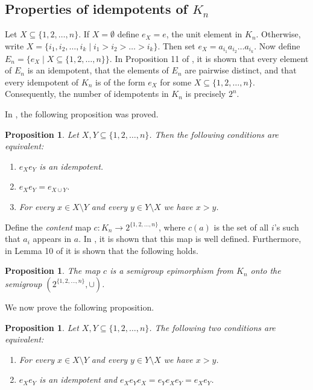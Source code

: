 \documentclass[pdflatex,sn-mathphys-num]{sn-jnl}%
\theoremstyle{thmstyleone}%
\newtheorem{proposition}[theorem]{Proposition}%
\theoremstyle{thmstyletwo}%
\theoremstyle{thmstylethree}%
\begin{document}
\subsection{Properties of idempotents of $K_n$}

Let $X \subseteq \{1, 2, \dots , n\}$. If $X = \emptyset$ define $e_X = e$, the unit element in $K_n$. Otherwise, write $X = \{i_1, i_2, \dots , i_k \mid i_1 > i_2 > \dots > i_k\}$. Then set
$e_X = a_{i_1} a_{i_2} \dots a_{i_k}$. Now define $E_n = \{e_X \mid X \subseteq \{1, 2, \dots, n\}\}$. In Proposition 11 of \cite{GK}, it is shown that every element of $E_n$ is an idempotent, that the elements of $E_n$ are pairwise distinct, and that every idempotent of $K_n$ is of the form $e_X$ for some $X \subseteq \{1, 2, \dots , n\}$. Consequently, the number of idempotents in $K_n$ is precisely $2^n$. 


In \cite[Proposition 14]{GK}, the following proposition was proved. 

\begin{proposition}\label{idem:eq}
   Let $X, Y \subseteq \{1, 2, \dots, n\}$. Then the following conditions are equivalent:
   \begin{enumerate}
      \item $e_X e_Y$ is an idempotent.
      \item $e_X e_Y = e_{X \cup Y}$.
      \item For every $x \in X \setminus Y$ and every $y \in Y \setminus X$ we have $x > y$.
   \end{enumerate}
\end{proposition}


Define the \emph{content} map $c : K_n \rightarrow 2^{\{1, 2, \dots, n\}}$, where $c(a)$ is the set of all $i$'s such that $a_i$ appears in $a$. In \cite{GK}, it is shown that this map is well defined.
Furthermore, in Lemma 10 of \cite{GK} it is shown that the following holds.


\begin{proposition}
  The map $c$ is a semigroup epimorphism from $K_n$ onto the semigroup $(2^{\{1, 2, \dots, n\}}, \cup)$.
\end{proposition} 

We now prove the following proposition.
\begin{proposition}\label{gate}
   Let $X, Y \subseteq \{1, 2, \dots , n\}$. The following two conditions are equivalent:
   \begin{enumerate}
      \item For every $x \in X \setminus Y$ and every $y \in Y \setminus X$ we have $x > y$.
      \item $e_X e_Y$ is an idempotent and $e_X e_Y e_X = e_Y e_X e_Y = e_X e_Y$.
   \end{enumerate}
\end{proposition} 
\end{document}
